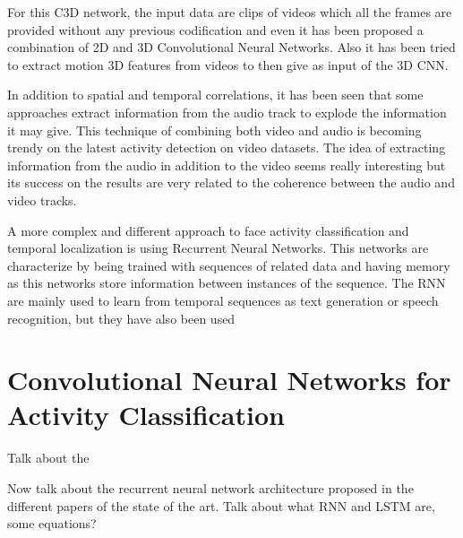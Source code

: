 For this C3D network, the input data are clips of videos which all the frames are provided without any previous codification and even it has been proposed a combination of 2D and 3D Convolutional Neural Networks\cite{Ng_2015_CVPR}\cite{yao2015describing}. Also it has been tried to extract motion 3D features from videos to then give as input of the 3D CNN\cite{yao2015describing}. 




In addition to spatial and temporal correlations, it has been seen that some approaches extract information from the audio track to explode the information it may give. This technique of combining both video and audio is becoming trendy on the latest activity detection on video datasets\cite{xu2015uts}. The idea of extracting information from the audio in addition to the video seems really interesting but its success on the results are very related to the coherence between the audio and video tracks. 

A more complex and different approach to face activity classification and temporal localization is using Recurrent Neural Networks. This networks are characterize by being trained with sequences of related data and having memory as this networks store information between instances of the sequence. The RNN are mainly used to learn from temporal sequences as text generation or speech recognition, but they have also been used 

\section{Convolutional Neural Networks for Activity Classification}

Talk about the 

Now talk about the recurrent neural network architecture proposed in the different papers of the state of the art. Talk about what RNN and LSTM are, some equations?


